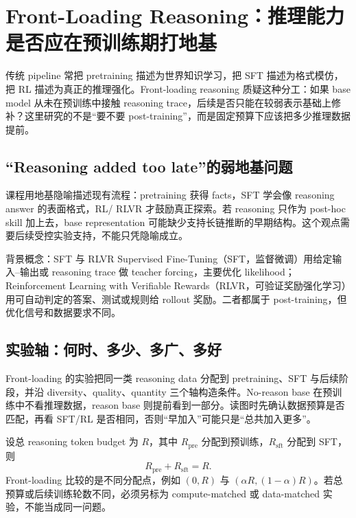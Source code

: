 \section{Front-Loading Reasoning：推理能力是否应在预训练期打地基}

传统 pipeline 常把 pretraining 描述为世界知识学习，把 SFT 描述为格式模仿，把 RL 描述为真正的推理强化。Front-loading reasoning 质疑这种分工：如果 base model 从未在预训练中接触 reasoning trace，后续是否只能在较弱表示基础上修补？这里研究的不是“要不要 post-training”，而是固定预算下应该把多少推理数据提前。

\subsection{“Reasoning added too late”的弱地基问题}

课程用地基隐喻描述现有流程：pretraining 获得 facts，SFT 学会像 reasoning answer 的表面格式，RL/ RLVR 才鼓励真正探索。若 reasoning 只作为 post-hoc skill 加上去，base representation 可能缺少支持长链推断的早期结构。这个观点需要后续受控实验支持，不能只凭隐喻成立。


\begin{knowledgebox}{背景概念：SFT 与 RLVR}
Supervised Fine-Tuning（SFT，监督微调）用给定输入--输出或 reasoning trace 做 teacher forcing，主要优化 likelihood；Reinforcement Learning with Verifiable Rewards（RLVR，可验证奖励强化学习）用可自动判定的答案、测试或规则给 rollout 奖励。二者都属于 post-training，但优化信号和数据要求不同。
\end{knowledgebox}

\subsection{实验轴：何时、多少、多广、多好}

Front-loading 的实验把同一类 reasoning data 分配到 pretraining、SFT 与后续阶段，并沿 diversity、quality、quantity 三个轴构造条件。No-reason base 在预训练中不看推理数据，reason base 则提前看到一部分。读图时先确认数据预算是否匹配，再看 SFT/RL 是否相同，否则“早加入”可能只是“总共加入更多”。


设总 reasoning token budget 为 $R$，其中 $R_{\mathrm{pre}}$ 分配到预训练，$R_{\mathrm{sft}}$ 分配到 SFT，则
\[
R_{\mathrm{pre}}+R_{\mathrm{sft}}=R.
\]
Front-loading 比较的是不同分配点，例如 $(0,R)$ 与 $(\alpha R,(1-\alpha)R)$。若总预算或后续训练轮数不同，必须另标为 compute-matched 或 data-matched 实验，不能当成同一问题。

